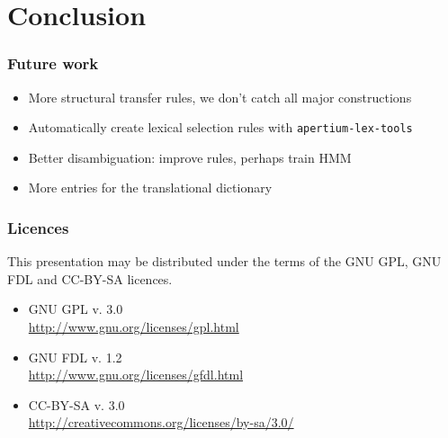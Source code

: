 \documentclass[notes=hide]{beamer}
\newcommand{\tool}[1]{\texttt{\small #1}}
\begin{document}
\section{Conclusion}
\begin{frame}\frametitle{Future work}
  \begin{itemize}
  \item More structural transfer rules, we don't catch all major
    constructions
  \item Automatically create lexical selection rules with \tool{apertium-lex-tools}
  \item Better disambiguation: improve rules, perhaps train HMM
  \item More entries for the translational dictionary
  \end{itemize}
\end{frame}

\begin{frame}\frametitle{Licences}
  This presentation may be distributed under the terms of the
  GNU GPL, GNU FDL and CC-BY-SA licences.
  \begin{itemize}
  \item GNU GPL v. 3.0 \\
    \href{http://www.gnu.org/licenses/gpl.html}{http://www.gnu.org/licenses/gpl.html}
  \item GNU FDL v. 1.2 \\
    \href{http://www.gnu.org/licenses/gfdl.html}{http://www.gnu.org/licenses/gfdl.html}
  \item CC-BY-SA v. 3.0 \\
    \href{http://creativecommons.org/licenses/by-sa/3.0/}{http://creativecommons.org/licenses/by-sa/3.0/}
  \end{itemize}
\end{frame}


\end{document}
